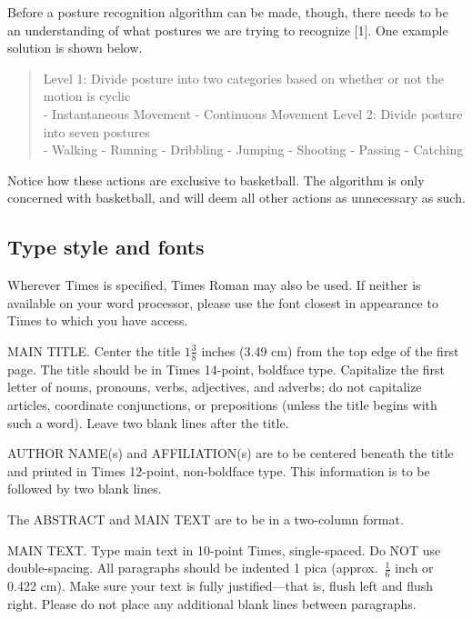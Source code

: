 \documentclass[10pt,twocolumn,letterpaper]{article}
\begin{document}
Before a posture recognition algorithm can be made, though, there needs to be an understanding of what postures we are trying to recognize [1]. One example solution is shown below. 
%
\begin{quotation}
  Level 1: Divide posture into two categories based on whether or not the motion is cyclic \\
  \indent - Instantaneous Movement 
  \indent - Continuous Movement 
  \newline
  \indent Level 2: Divide posture into seven postures \\
  \indent - Walking 
  \indent - Running 
  \indent - Dribbling 
  \indent - Jumping 
  \indent - Shooting 
  \indent - Passing 
  \indent - Catching 
\end{quotation}
%

Notice how these actions are exclusive to basketball. The algorithm is only concerned with basketball, and will deem all other actions as unnecessary as such. 


\subsection{Type style and fonts}

Wherever Times is specified, Times Roman may also be used.
If neither is available on your word processor, please use the font closest in
appearance to Times to which you have access.

MAIN TITLE.
Center the title $1\frac{3}{8}$ inches (3.49 cm) from the top edge of the first page.
The title should be in Times 14-point, boldface type.
Capitalize the first letter of nouns, pronouns, verbs, adjectives, and adverbs;
do not capitalize articles, coordinate conjunctions, or prepositions (unless the title begins with such a word).
Leave two blank lines after the title.

AUTHOR NAME(s) and AFFILIATION(s) are to be centered beneath the title
and printed in Times 12-point, non-boldface type.
This information is to be followed by two blank lines.

The ABSTRACT and MAIN TEXT are to be in a two-column format.

MAIN TEXT.
Type main text in 10-point Times, single-spaced.
Do NOT use double-spacing.
All paragraphs should be indented 1 pica (approx.~$\frac{1}{6}$ inch or 0.422 cm).
Make sure your text is fully justified---that is, flush left and flush right.
Please do not place any additional blank lines between paragraphs.
\end{document}
